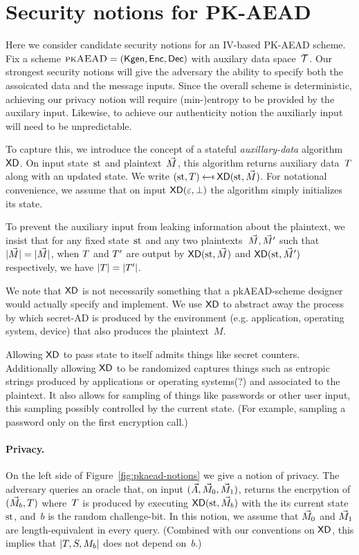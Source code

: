 
\section{Security notions for PK-AEAD} 
Here we consider candidate security notions for an IV-based PK-AEAD scheme.  Fix a scheme $\textsc{pkAEAD}=(\mathsf{Kgen},{\mathsf{Enc}},{\mathsf{Dec}})$ with auxilary data space~$\mathcal{T}$.  Our strongest security notions will give the adversary the ability to specify both the assoicated data and the message inputs.  Since the overall scheme is deterministic, achieving our privacy notion will require (min-)entropy to be provided by the auxilary input.  Likewise, to achieve our authenticity notion the auxiliarly input will need to be unpredictable.

To capture this, we introduce the concept of a stateful \emph{auxillary-data} algorithm $\mathsf{XD}$.  On input state~$\mathrm{st}$ and plaintext~$\vec{M}$, this algorithm returns auxiliary data~$T$ along with an updated state.  We write $(\st,\umd) \getsr \mdalg(\st,\vmsg)$. For notational convenience, we assume that on input $\mathsf{XD}(\varepsilon,\bot)$ the algorithm simply initializes its state. 

To prevent the auxiliary input from leaking information about the plaintext, we insist that for any fixed state~$\mathrm{st}$ and any two plaintexts~$\vec{M},\vec{M}'$ such that $|\vec{M}|=|\vec{M}|$, when $T$ and $T'$ are output by $\mathsf{XD}(\mathrm{st},\vec{M})$ and $\mathsf{XD}(\mathrm{st},\vec{M}')$ respectively, we have $|T|=|T'|$. 

We note that $\mathsf{XD}$ is not necessarily something that a pkAEAD-scheme designer would actually specify and implement.  We use $\mathsf{XD}$ to abstract away the process by which secret-AD is produced by the environment (e.g. application, operating system, device) that also produces the plaintext~$M$. 

Allowing $\mathsf{XD}$ to pass state to itself admits things like secret counters.  Additionally allowing $\mathsf{XD}$ to be randomized captures things such as entropic strings produced by applications or operating systems(?) and associated to the plaintext.  It also allows for sampling of things like passwords or other user input, this sampling possibly controlled by the current state.  (For example, sampling a password only on the first encryption call.)


\paragraph{Privacy. }
On the left side of Figure~\ref{fig:pkaead-notions} we give a notion of privacy.  The adversary queries an oracle that, on input $(\vec{A},\vec{M}_0,\vec{M}_1)$, returns the encrpytion of $(\vec{M}_b,T)$ where~$T$ is produced by executing $\mathsf{XD}(\mathrm{st},\vec{M}_b)$ with the its current state~$\mathrm{st}$, and~$b$ is the random challenge-bit.  In this notion, we assume that $\vec{M}_0$ and $\vec{M}_1$ are length-equivalent in every query. (Combined with our conventions on $\mathsf{XD}$, this implies that $|T,S,M_b|$ does not depend on~$b$.) 


